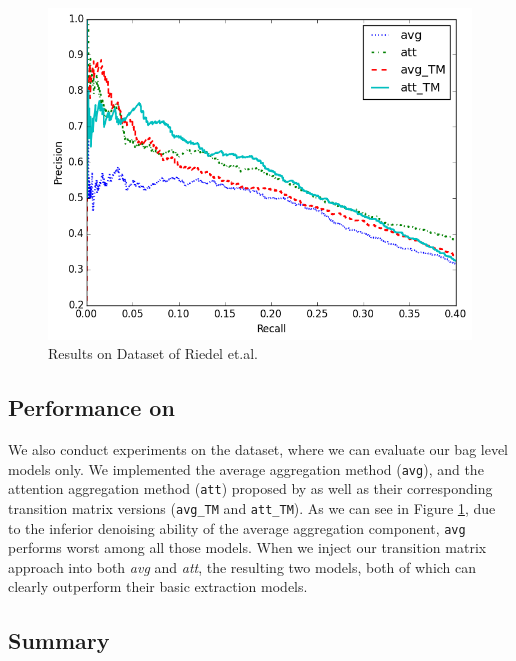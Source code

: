 \begin{figure}[t!]
\includegraphics[width=0.9\linewidth]{figures/re_att_avg_cmp_exp.png}
\caption{Results on Dataset of Riedel et.al.}
\label{fig: Riedel_res}
\end{figure}

\subsection{Performance on \EntityRE}
We also conduct experiments on the \EntityRE dataset, where we can evaluate our bag level models only.  
We  implemented the average aggregation method (\texttt{avg}), and the attention aggregation method (\texttt{att}) proposed by \cite{lin2016neural} as well as their corresponding transition matrix versions (\texttt{avg\_TM} and \texttt{att\_TM}). As we can see in Figure \ref{fig: Riedel_res},  due to the inferior denoising ability of the average aggregation component, \texttt{avg} performs worst among all those models. %
When we inject our transition matrix approach into both \emph{avg} and \emph{att}, the resulting two  models, both of which can  clearly outperform their basic extraction models.
%

\subsection{Summary}
